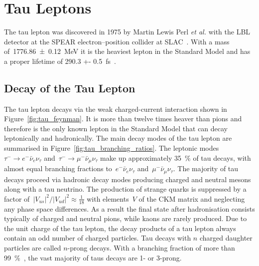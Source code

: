 \section{Tau Leptons}

The tau lepton was discovered in 1975 by Martin Lewis Perl \textit{et al.} with
the LBL detector at the SPEAR electron--position collider at SLAC~\cite{perl}.
With a mass of~\SI{1776.86 +- 0.12}{\MeV} it is the heaviest lepton in the
Standard Model and has a proper lifetime of \SI{290.3 +-
  0.5}{\femto\second}~\cite{pdg}.

\subsection{Decay of the Tau Lepton}

The tau lepton decays via the weak charged-current interaction shown in
Figure~\ref{fig:tau_feynman}. It is more than twelve times heaver than pions and
therefore is the only known lepton in the Standard Model that can decay
leptonically and hadronically. The main decay modes of the tau lepton are
summarised in Figure~\ref{fig:tau_branching_ratios}. The leptonic
modes~\mbox{$\tau^- \to e^- \bar{\nu}_e \nu_\tau$}
and~\mbox{$\tau^- \to \mu^- \bar{\nu}_\mu \nu_\tau$} make up approximately
\SI{35}{\percent} of tau decays, with almost equal branching fractions
to~$e^- \bar{\nu}_e \nu_\tau$ and~$\mu^- \bar{\nu}_\mu \nu_\tau$. The majority
of tau decays proceed via hadronic decay modes producing charged and neutral
mesons along with a tau neutrino. The production of strange quarks is suppressed
by a factor of~$|V_{us}|^2 / |V_{ud}|^2 \approx \frac{1}{18}$ with elements~$V$
of the CKM matrix and neglecting any phase space differences. As a result the
final state after hadronisation consists typically of charged and neutral pions,
while kaons are rarely produced. Due to the unit charge of the tau lepton, the
decay products of a tau lepton always contain an odd number of charged
particles. Tau decays with $n$ charged daughter particles are called $n$-prong
decays. With a branching fraction of more than \SI{99}{\percent}~\cite{pdg}, the
vast majority of taus decays are 1- or 3-prong. 

